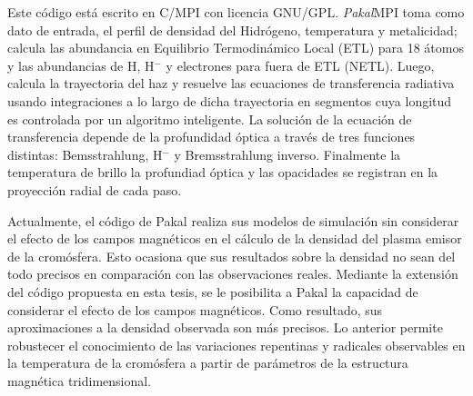 Este c\'odigo est\'a escrito en C/MPI con licencia GNU/GPL. \emph{Pakal}MPI toma como dato de entrada, el perfil de densidad del Hidr\'ogeno, temperatura y metalicidad; calcula las abundancia en Equilibrio Termodin\'amico  Local (ETL) para 18 \'atomos y las abundancias de H, H$^{-}$ y electrones para fuera de ETL (NETL). Luego, calcula la trayectoria del haz y resuelve las ecuaciones de transferencia radiativa usando integraciones a lo largo de dicha trayectoria en segmentos cuya longitud es controlada por un algoritmo inteligente. La soluci\'on de la ecuaci\'on de transferencia depende de la profundidad \'optica a trav\'es de tres funciones distintas: Bemsstrahlung, H$^{-}$ y Bremsstrahlung inverso. Finalmente la temperatura de brillo la profundiad \'optica y las opacidades se registran en la proyecci\'on radial de cada paso.

Actualmente, el c\'odigo de Pakal realiza sus modelos de simulaci\'on sin considerar el efecto de los campos magn\'eticos en el c\'alculo de la densidad del plasma emisor de la crom\'osfera. Esto ocasiona que sus resultados sobre la densidad no sean del todo precisos en comparaci\'on con las observaciones reales. Mediante la extensi\'on del c\'odigo propuesta en esta tesis, se le posibilita a Pakal la capacidad de considerar el efecto de los campos magn\'eticos. Como resultado, sus aproximaciones a la densidad observada son m\'as precisos. Lo anterior permite robustecer el conocimiento de las variaciones repentinas y radicales observables en la temperatura de la crom\'osfera a partir de par\'ametros de la estructura magn\'etica tridimensional.
